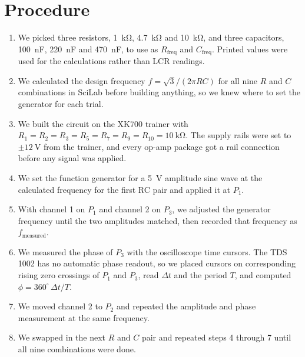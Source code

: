 \documentclass[11pt]{article}
\begin{document}
\section*{Procedure}
\begin{enumerate}[leftmargin=*]
    \item We picked three resistors, \qty{1}{\kilo\ohm}, \qty{4.7}{\kilo\ohm}
    and \qty{10}{\kilo\ohm}, and three capacitors, \qty{100}{\nano\farad},
    \qty{220}{\nano\farad} and \qty{470}{\nano\farad}, to use as
    $R_{\text{freq}}$ and $C_{\text{freq}}$. Printed values were used for the
    calculations rather than LCR readings.

    \item We calculated the design frequency $f = \sqrt{3}/(2\pi RC)$ for all
    nine $R$ and $C$ combinations in SciLab before building anything, so we knew
    where to set the generator for each trial.

    \item We built the circuit on the XK700 trainer with
    $R_1 = R_2 = R_3 = R_5 = R_7 = R_9 = R_{10} = \qty{10}{\kilo\ohm}$. The
    supply rails were set to $\pm\qty{12}{\volt}$ from the trainer, and every
    op-amp package got a rail connection before any signal was applied.

    \item We set the function generator for a \qty{5}{\volt} amplitude sine wave
    at the calculated frequency for the first RC pair and applied it at $P_1$.

    \item With channel 1 on $P_1$ and channel 2 on $P_3$, we adjusted the
    generator frequency until the two amplitudes matched, then recorded that
    frequency as $f_{\text{measured}}$.

    \item We measured the phase of $P_3$ with the oscilloscope time cursors. The
    TDS 1002 has no automatic phase readout, so we placed cursors on
    corresponding rising zero crossings of $P_1$ and $P_3$, read $\Delta t$ and
    the period $T$, and computed
    $\phi = 360^{\circ}\,\Delta t / T$.

    \item We moved channel 2 to $P_2$ and repeated the amplitude and phase
    measurement at the same frequency.

    \item We swapped in the next $R$ and $C$ pair and repeated steps 4 through 7
    until all nine combinations were done.
\end{enumerate}
\end{document}
